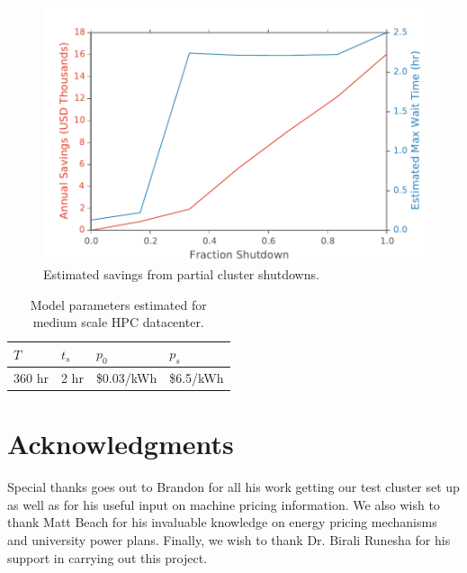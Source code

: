 \documentclass[letterpaper,twocolumn,10pt]{article}
\begin{document}
\begin{figure}[t]
	\begin{center}
		\includegraphics[scale=0.5]{final}
	\end{center}
	\caption{Estimated savings from partial cluster shutdowns. }
	\label{final}
\end{figure}


\begin{table}[]
	\centering
	\label{my-label}
	\begin{tabular}{|l|l|l|l|}
		\hline
		\textbf{$T$} & \textbf{$t_s$} & \textbf{$p_0$} & \textbf{$p_s$}  \\ \hline
		360 hr & 2 hr & \$0.03/kWh  & \$6.5/kWh    \\ \hline
	\end{tabular}
	\caption{Model parameters estimated for medium scale HPC datacenter.}
	\label{params}
\end{table}

\section{Acknowledgments}

Special thanks goes out to Brandon for all his work getting our test cluster set up as well as for his useful input on machine pricing information.  We also wish to thank Matt Beach for his invaluable knowledge on energy pricing mechanisms and university power plans.  Finally, we wish to thank Dr. Birali Runesha for his support in carrying out this project.
\end{document}
